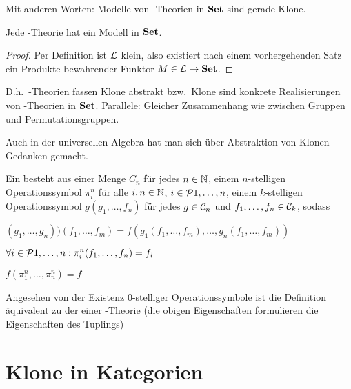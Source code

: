 \documentclass{book}
\begin{document}
Mit anderen Worten: Modelle von -Theorien in $\mathbf{Set}$ sind gerade Klone.

\begin{theorem}
    Jede -Theorie hat ein Modell in $\mathbf{Set}$.
\end{theorem}

\begin{proof}
    Per Definition ist $\mathcal{L}$ klein, also existiert nach einem vorhergehenden Satz ein Produkte bewahrender Funktor $M\in\mathcal{L}\rightarrow\mathbf{Set}$.
\end{proof}

\begin{remark}
    D.h.~-Theorien fassen Klone abstrakt bzw.~Klone sind konkrete Realisierungen von -Theorien in $\mathbf{Set}$.
    Parallele: Gleicher Zusammenhang wie zwischen Gruppen und Permutationsgruppen.
\end{remark}

Auch in der universellen Algebra hat man sich über Abstraktion von Klonen Gedanken gemacht.

\begin{definition}
    Ein  besteht aus einer Menge $C_n$ für jedes $n\in\mathbb{N}$,
    einem $n$-stelligen Operationssymbol $\pi^n_i$ für alle $i,n\in\mathbb{N}$, $i\in\set{1,\ldots,n}$, einem $k$-stelligen Operationssymbol $g(g_1,\ldots,f_n)$ für jedes $g\in\mathcal{C}_n$ und $f_1,\ldots,f_n\in\mathcal{C}_k$, sodass
    \begin{statements}
            \item $(g_1,\ldots,g_n))(f_1,\ldots,f_m)=f(g_1(f_1,\ldots,f_m),\ldots,g_n(f_1,\ldots,f_m))$
            \item $\forall i\in\set{1,\ldots,n}:\pi^n_i(f_1,\ldots,f_n)=f_i$
            \item $f(\pi_1^n,\ldots,\pi^n_n)=f$
    \end{statements}
\end{definition}

\begin{remark}
    Angesehen von der Existenz $0$-stelliger Operationssymbole ist die Definition äquivalent zu der einer -Theorie (die obigen Eigenschaften formulieren die Eigenschaften des Tuplings)
\end{remark}

\section{Klone in Kategorien}
\end{document}
